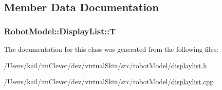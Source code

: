 \subsection{Member Data Documentation}
\hypertarget{class_robot_model_1_1_display_list_a9058babda6102fe41186f806990aa350}{
\subsubsection[{T}]{ {\bf RobotModel::DisplayList::T}}}
\label{class_robot_model_1_1_display_list_a9058babda6102fe41186f806990aa350}


The documentation for this class was generated from the following files:\begin{DoxyCompactItemize}
\item 
/Users/kail/imClever/dev/virtualSkin/src/robotModel/\hyperlink{displaylist_8h}{displaylist.h}\item 
/Users/kail/imClever/dev/virtualSkin/src/robotModel/\hyperlink{displaylist_8cpp}{displaylist.cpp}\end{DoxyCompactItemize}
